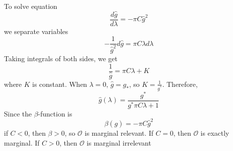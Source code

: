 To solve equation
\begin{equation}
	\frac{d\hat{g}}{d\lambda} = - \pi C \hat{g}^2
\end{equation}
we separate variables
\[
- \frac{1}{\hat{g}^2} d \hat{g} = \pi C \lambda d\lambda
\]
Taking integrals of both sides, we get
\begin{equation}
\frac{1}{\hat{g}} = \pi C\lambda +K
\end{equation}
where $K$ is constant. When $\lambda=0$, $\hat{g} = g_*$, so $K = \frac{1}{g^*}$. Therefore,
\[
\hat{g}(\lambda) = \frac{g^*}{g^* \pi C \lambda +1}
\]
Since the $\beta$-function is
\[ 
\beta(\hat{g}) = - \pi C \hat{g}^2
\]
if $C < 0$, then $\beta > 0$, so $\mathcal{O}$ is marginal relevant. If $C=0$, then $\mathcal{O}$ is exactly marginal. If $C > 0$, then $\mathcal{O}$ is marginal irrelevant
